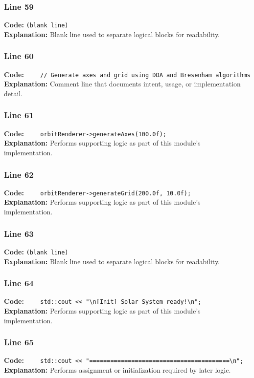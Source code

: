 \documentclass[11pt,a4paper]{article}
\begin{document}
\subsubsection*{Line 59}
\textbf{Code:} \texttt{(blank line)}\\
\textbf{Explanation:} Blank line used to separate logical blocks for readability.

\subsubsection*{Line 60}
\textbf{Code:} \verb|    // Generate axes and grid using DDA and Bresenham algorithms|\\
\textbf{Explanation:} Comment line that documents intent, usage, or implementation detail.

\subsubsection*{Line 61}
\textbf{Code:} \verb|    orbitRenderer->generateAxes(100.0f);|\\
\textbf{Explanation:} Performs supporting logic as part of this module's implementation.

\subsubsection*{Line 62}
\textbf{Code:} \verb|    orbitRenderer->generateGrid(200.0f, 10.0f);|\\
\textbf{Explanation:} Performs supporting logic as part of this module's implementation.

\subsubsection*{Line 63}
\textbf{Code:} \texttt{(blank line)}\\
\textbf{Explanation:} Blank line used to separate logical blocks for readability.

\subsubsection*{Line 64}
\textbf{Code:} \verb|    std::cout << "\n[Init] Solar System ready!\n";|\\
\textbf{Explanation:} Performs supporting logic as part of this module's implementation.

\subsubsection*{Line 65}
\textbf{Code:} \verb|    std::cout << "========================================\n";|\\
\textbf{Explanation:} Performs assignment or initialization required by later logic.
\end{document}
